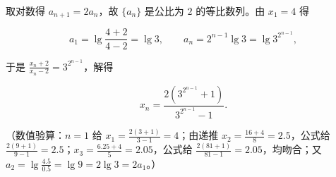 \begin{answer}
取对数得 $a_{n+1}=2a_n$，故 $\{a_n\}$ 是公比为 $2$ 的等比数列。由 $x_1=4$ 得

\nopagebreak[4]
\[a_1=\lg\frac{4+2}{4-2}=\lg3,\qquad a_n=2^{n-1}\lg3=\lg3^{2^{n-1}},\]

于是 $\frac{x_n+2}{x_n-2}=3^{2^{n-1}}$，解得

\nopagebreak[4]
\[x_n=\frac{2\left(3^{2^{n-1}}+1\right)}{3^{2^{n-1}}-1}.\]

（数值验算：$n=1$ 给 $x_1=\frac{2(3+1)}{3-1}=4$；由递推 $x_2=\frac{16+4}{8}=2.5$，公式给 $\frac{2(9+1)}{9-1}=2.5$；$x_3=\frac{6.25+4}{5}=2.05$，公式给 $\frac{2(81+1)}{81-1}=2.05$，均吻合；又 $a_2=\lg\frac{4.5}{0.5}=\lg9=2\lg3=2a_1$。）


\end{answer}
